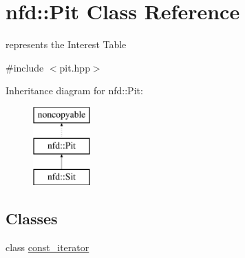 \hypertarget{classnfd_1_1Pit}{}\section{nfd\+:\+:Pit Class Reference}
\label{classnfd_1_1Pit}


represents the Interest Table  




{\ttfamily \#include $<$pit.\+hpp$>$}

Inheritance diagram for nfd\+:\+:Pit\+:\begin{figure}[H]
\begin{center}
\leavevmode
\includegraphics[height=3.000000cm]{classnfd_1_1Pit}
\end{center}
\end{figure}
\subsection*{Classes}
\begin{DoxyCompactItemize}
\item 
class \hyperlink{classnfd_1_1Pit_1_1const__iterator}{const\+\_\+iterator}
\end{DoxyCompactItemize}
